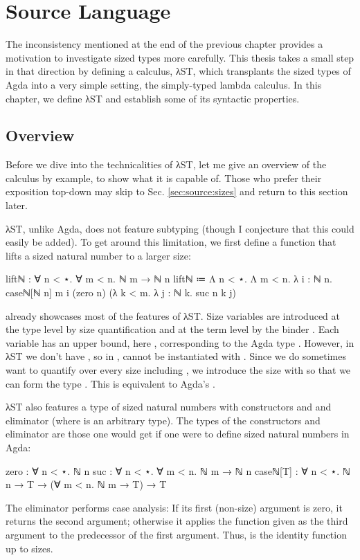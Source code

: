 \chapter{Source Language}
\label{sec:source}

The inconsistency mentioned at the end of the previous chapter provides a
motivation to investigate sized types more carefully. This thesis takes a small
step in that direction by defining a calculus, λST, which transplants the sized
types of Agda into a very simple setting, the simply-typed lambda calculus. In
this chapter, we define λST and establish some of its syntactic properties.


\section{Overview}
\label{sec:source:overview}

Before we dive into the technicalities of λST, let me give an overview of the
calculus by example, to show what it is capable of. Those who prefer their
exposition top-down may skip to Sec. \ref{sec:source:sizes} and return to this
section later.

λST, unlike Agda, does not feature subtyping (though I conjecture that this
could easily be added). To get around this limitation, we first define a
function that lifts a sized natural number to a larger size:
\begin{code}
  liftℕ : ∀ n < ⋆. ∀ m < n. ℕ m → ℕ n
  liftℕ ≔ Λ n < ⋆. Λ m < n. λ i : ℕ n.
          caseℕ[ℕ n] m i
            (zero n)
            (λ k < m. λ j : ℕ k. suc n k j)
\end{code}

 already showcases most of the features of λST. Size variables are
introduced at the type level by size quantification  and at
the term level by the binder . Each variable has an upper
bound, here , corresponding to the Agda type . However,
in λST we don't have , so in ,  cannot
be instantiated with . Since we do sometimes want to quantify over
every size including , we introduce the size  with
 so that we can form the type . This is
equivalent to Agda's .

λST also features a type of sized natural numbers  with constructors
 and  and eliminator  (where  is
an arbitrary type). The types of the constructors and eliminator are those one
would get if one were to define sized natural numbers in Agda:
\begin{code}
  zero     : ∀ n < ⋆. ℕ n
  suc      : ∀ n < ⋆. ∀ m < n. ℕ m → ℕ n
  caseℕ[T] : ∀ n < ⋆. ℕ n → T → (∀ m < n. ℕ m → T) → T
\end{code}
The  eliminator performs case analysis: If its first (non-size)
argument is zero, it returns the second argument; otherwise it applies the
function given as the third argument to the predecessor of the first argument.
Thus,  is the identity function up to sizes.

